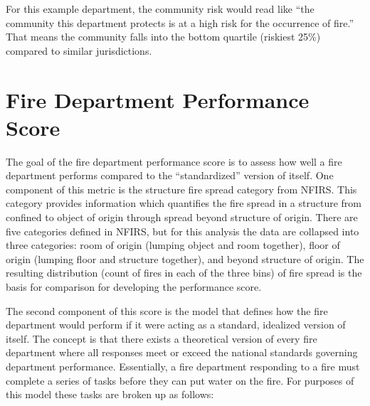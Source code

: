\documentclass[12pt,oneside]{book}
\begin{document}
For this example department, the community risk would read like ``the community this department protects is at a high risk for the occurrence of fire.'' That means the community falls into the bottom quartile (riskiest 25\%) compared to similar jurisdictions.

\section{Fire Department Performance Score}

The goal of the fire department performance score is to assess how well a fire department performs compared to the ``standardized'' version of itself. One component of this metric is the structure fire spread category from NFIRS. This category provides information which quantifies the fire spread in a structure from confined to object of origin through spread beyond structure of origin. There are five categories defined in NFIRS, but for this analysis the data are collapsed into three categories: room of origin (lumping object and room together), floor of origin (lumping floor and structure together), and beyond structure of origin. The resulting distribution (count of fires in each of the three bins) of fire spread is the basis for comparison for developing the performance score.

The second component of this score is the model that defines how the fire department would perform if it were acting as a standard, idealized version of itself. The concept is that there exists a theoretical version of every fire department where all responses meet or exceed the national standards governing department performance. Essentially, a fire department responding to a fire must complete a series of tasks before they can put water on the fire. For purposes of this model these tasks are broken up as follows:
\end{document}
